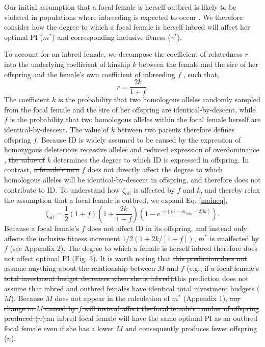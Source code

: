 \documentclass[12pt]{article}
\begin{document}
Our initial assumption that a focal female is herself outbred is likely to be violated in populations where inbreeding is expected to occur \cite[][]{Duthie2015a}. We therefore consider how the degree to which a focal female is herself inbred will affect her optimal PI ($m^{*}$) and corresponding inclusive fitness ($\gamma^{*}$).

To account for an inbred female, we decompose the coefficient of relatedness $r$ into the underlying coefficient of kinship $k$ between the female and the sire of her offspring and the female's own coefficient of inbreeding $f$  \cite[see][]{Hamilton1972, Michod1979}, such that,
\begin{equation} \label{rdef}
r = \frac{2k}{1 + f}.
\end{equation}
The coefficient $k$ is the probability that two homologous alleles randomly sampled from the focal female and the sire of her offspring are identical-by-descent, while $f$ is the probability that two homologous alleles within the focal female herself are identical-by-descent. The value of $k$ between two parents therefore defines offspring $f$. Because ID is widely assumed to be caused by the expression of homozygous deleterious recessive alleles and reduced expression of overdominance \cite[][]{Charlesworth2009}, {\color{red}\st{the value of}} $k$ determines the degree to which ID is expressed in offspring. In contrast, {\color{red}\st{a female's own}} $f$ does not directly affect the degree to which homologous alleles will be identical-by-descent in offspring, and therefore does not contribute to ID. To understand how $\zeta_{\textrm{off}}$ is affected by $f$ and $k$, and thereby relax the assumption that a focal female is outbred, we expand Eq. \ref{maineq},
\begin{equation} \label{maineqr}
\zeta_{\textrm{off}} = \frac{1}{2}\left(1+f\right)\left(1+\frac{2k}{1+f}\right)\left(1-e^{-c\left(m-m_{min}-2\beta k\right)}\right).
\end{equation}
Because a focal female's $f$ does not affect ID in its offspring, and instead only affects the inclusive fitness increment $1/2\left(1+ 2 k / \left[1 + f\right]\right)$, $m^{*}$ is unaffected by $f$  (see Appendix 2). The degree to which a female is herself inbred therefore does not affect optimal PI (Fig. 3). It is worth noting that {\color{red}\st{this prediction does not assume anything about the relationship between $M$ and $f$ (e.g., if a focal female's total investment budget decreases when she is inbred).}}{\color{blue}this prediction does not assume that inbred and outbred females have identical total investment budgets ($M$)}. Because $M$ does not appear in the calculation of $m^{*}$ (Appendix 1), {\color{red}\st{any change in $M$ caused by $f$ will instead affect the focal female's number of offspring produced ($n$).}}{\color{blue}an inbred focal female will have the same optimal PI as an outbred focal female even if she has a lower $M$ and consequently produces fewer offspring ($n$).}
\end{document}
